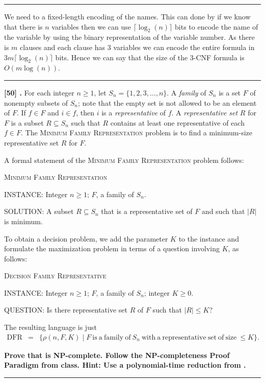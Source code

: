 \documentclass[11pt,twoside]{article}
\newcounter{problem}
\newcommand{\problem}[1]{%
\refstepcounter{problem}\noindent\textbf{[#1] \arabic{problem}.}}
\newcommand{\solution}{\bigskip\hrule\bigskip}
\newcommand{\problembreak}{\bigskip\hrule\bigskip}
\newlength{\problemoffset}
\newcommand{\decision}[3]{%
\begin{list}{}{
\setlength{\leftmargin}{\problemoffset}
\setlength{\rightmargin}{\problemoffset}
\setlength{\parsep}{0pt}
\setlength{\itemsep}{2pt}
\setlength{\topsep}{\itemsep}
\setlength{\partopsep}{\itemsep}
}
\item
{\textsc{#1}}
\item
{INSTANCE: #2}
\item
{QUESTION: #3}
\end{list}
}
\newcommand{\optimization}[3]{%
\begin{list}{}{
\setlength{\leftmargin}{\problemoffset}
\setlength{\rightmargin}{\problemoffset}
\setlength{\parsep}{0pt}
\setlength{\itemsep}{2pt}
\setlength{\topsep}{\itemsep}
\setlength{\partopsep}{\itemsep}
}
\item
{\rule{0pt}{14pt}\textsc{#1}}
\item
{INSTANCE: #2}
\item
{SOLUTION: #3}
\end{list}
}
\newenvironment{SLOPPY}{\begin{sloppypar}\hbadness=10000}{\end{sloppypar}}
\begin{document}
\solution

We need to a fixed-length encoding of the names. This can done by if we know that there is $n$ variables then we can use $\lceil \log_2(n)\rceil $ bits to encode the name of the variable by using the binary representation of the variable number. As there is $m$ clauses and each clause has $3$ variables we can encode the entire formula in $3m\lceil \log_2(n)\rceil$ bits. Hence we can say that the size of the 3-CNF formula is $O(m\log(n))$.


\problembreak

\problem{50}
For each integer $n\geq1$,
let $S_n=\{1,2,3,\ldots,n\}$.
A \textit{family} of $S_n$
is a set $F$ of nonempty subsets of $S_n$;
note that the empty set is not allowed to be an element of $F$.
If $f\in F$ and $i\in f$,
then $i$ is a \textit{representative} of $f$.
A \textit{representative set} $R$ for $F$
is a subset $R\subseteq S_n$ such that $R$
contains at least one representative of each $f\in F$.
The \textsc{Minimum Family Representation} problem is
to find a minimum-size representative set $R$ for $F$.

A formal statement
of the \textsc{Minimum Family Representation} problem follows:
\optimization{Minimum Family Representation}%
{Integer $n\geq1$;
$F$, a family of $S_n$.}%
{A subset $R\subseteq S_n$
that is a representative set of $F$
and such that $|R|$ is minimum.}

To obtain a decision problem,
we add the parameter $K$ to the instance
and
formulate the maximization problem
in terms of a question involving $K$,
as follows:
\decision{Decision Family Representative}%
{Integer $n\geq1$;
$F$, a family of $S_n$; integer $K\geq0$.}%
{Is there representative set $R$ of $F$
such that $|R|\leq K$?}

The resulting language is just
\begin{eqnarray*}
\mathrm{DFR}
& = &
\{
\rho(n,F,K)
\mid
F \mathrm{\ is\ a\ family\ of\ } S_n
\mathrm{\ with\ a\ representative\ set\ of\ size\ } \leq K
\}.
\end{eqnarray*}

\begin{SLOPPY}

{\bfseries
Prove that {} is NP-complete.
Follow the NP-completeness Proof Paradigm from class.
Hint: Use a polynomial-time reduction from {}.
}

\end{SLOPPY}

\solution
\end{document}
